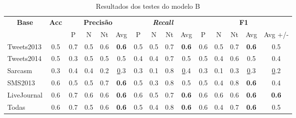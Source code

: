 \documentclass[12pt]{article}
\begin{document}
\begin{table}[H]
\centering
\begin{adjustwidth}{-1cm}{}
\begin{tabular}{lcccccccccccccc}
\multicolumn{1}{c}{\textbf{Base}} & \textbf{Acc} & \multicolumn{4}{c}{\textbf{Precisão}} & \multicolumn{4}{c}{\textit{\textbf{Recall}}} & \multicolumn{5}{c}{\textbf{F1}} \\
 &  & \multicolumn{1}{c|}{P} & \multicolumn{1}{c|}{N} & \multicolumn{1}{c|}{Nt} & Avg & \multicolumn{1}{c|}{P} & \multicolumn{1}{c|}{N} & \multicolumn{1}{c|}{Nt} & Avg & \multicolumn{1}{c|}{P} & \multicolumn{1}{c|}{N} & \multicolumn{1}{c|}{Nt} & \multicolumn{1}{c|}{Avg} & Avg +/- \\
Tweets2013 & 0.5 & 0.7 & 0.5 & 0.6 & \textbf{0.6} & 0.5 & 0.5 & 0.7 & \textbf{0.6} & 0.6 & 0.5 & 0.7 & \textbf{0.6} & 0.5 \\ \hline
Tweets2014 & 0.5 & 0.3 & 0.5 & 0.5 & 0.5 & 0.4 & 0.4 & 0.7 & 0.5 & 0.5 & 0.4 & 0.6 & 0.5 & 0.4 \\ \hline
Sarcasm & 0.3 & 0.4 & 0.4 & 0.2 & {\ul 0.3} & 0.3 & 0.1 & 0.8 & {\ul 0.4} & 0.3 & 0.1 & 0.3 & {\ul 0.3} & {\ul 0.2} \\ \hline
SMS2013 & 0.6 & 0.5 & 0.5 & 0.7 & \textbf{0.6} & 0.5 & 0.3 & 0.8 & 0.5 & 0.5 & 0.4 & 0.8 & \textbf{0.6} & 0.4 \\ \hline
LiveJournal & 0.6 & 0.7 & 0.6 & 0.6 & \textbf{0.6} & 0.6 & 0.5 & 0.7 & \textbf{0.6} & 0.6 & 0.6 & 0.6 & \textbf{0.6} & \textbf{0.6} \\ \hline
Todas & 0.6 & 0.7 & 0.5 & 0.6 & \textbf{0.6} & 0.5 & 0.4 & 0.8 & \textbf{0.6} & 0.6 & 0.4 & 0.7 & \textbf{0.6} & 0.5 \\ \hline
\end{tabular}
\caption{Resultados dos testes do modelo B}
\label{test2}
\end{adjustwidth}
\end{table}
\end{document}
